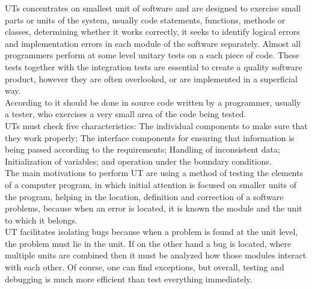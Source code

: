 \ac{UT}s concentrates on smallest unit of software and are designed to exercise small
parts or units of the system, usually code statements, functions, methods or classes,
determining whether it works correctly, it seeks to identify logical errors
and implementation errors in each module of the software separately.
Almost all programmers perform at some level unitary tests on a each piece of code.
These tests together with the integration tests are essential to create a quality software product\cite{dustin2002effective},
however they are often overlooked, or are implemented in a superficial way.\\
According to \cite{Hunt:2003:PUT:1197403} it should be done in source code written by a programmer, usually a tester,
who exercises a very small area of the code being tested.\\
\ac{UT}s must check five characteristics: The individual components to make sure that they work properly;
The interface components for ensuring that information is being passed according to the requirements;
Handling of inconsistent data; Initialization of variables; and operation under the boundary conditions.\\
The main motivations to perform \ac{UT} are using a method of testing the elements of a computer program,
in which initial attention is focused on smaller units of the program, helping in the location, definition and correction of a software problems,
because when an error is located, it is known the module and the unit to which it belongs\cite{Myers:2004:AST:983238}.\\
\ac{UT} facilitates isolating bugs because when a problem is found at the unit level, the problem must lie in the unit.
If on the other hand a bug is located, where multiple units are combined then it must be analyzed how those modules interact with each other.
Of course, one can find exceptions, but overall, testing and debugging is much more efficient than test everything immediately\cite{Patton:2000:ST:517489}.\\

